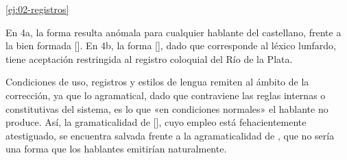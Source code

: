 \begin{solucion}{\ref{ej:02-registros}}
\begin{consignas}
  \item En 4a, la forma  resulta anómala para
        cualquier hablante del castellano, frente a la bien formada
        []. En 4b, la forma [], dado que
        corresponde al léxico lunfardo, tiene aceptación restringida al registro
        coloquial del Río de la Plata.
  \item Condiciones de uso, registros y estilos de lengua remiten al ámbito de
        la corrección, ya que lo agramatical, dado que contraviene las reglas
        internas o constitutivas del sistema, es lo que «en condiciones
        normales» el hablante no produce. Así, la gramaticalidad de
        [], cuyo empleo está fehacientemente atestiguado, se
        encuentra salvada frente a la agramaticalidad de
        , que no sería una forma que los
        hablantes emitirían naturalmente.
\end{consignas}
\end{solucion}

